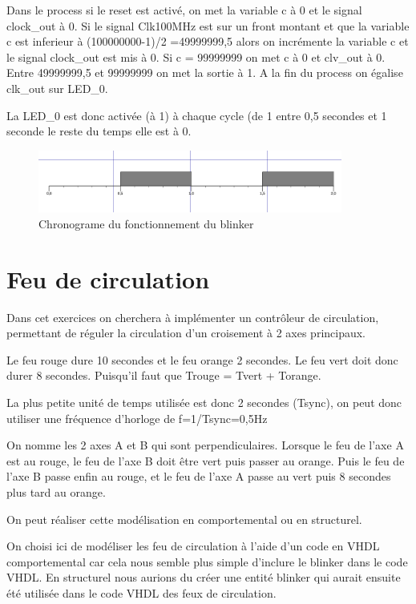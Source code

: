 \documentclass[11pt]{report}
\begin{document}
Dans le process si le reset est activé, on met la variable c à 0 et le signal clock\_out à 0. Si le signal Clk100MHz est sur un front montant et que la variable c est inferieur à (100000000-1)/2 =49999999,5 alors on incrémente la variable c et le signal clock\_out est mis à 0. Si c = 99999999 on met c à 0 et clv\_out à 0. Entre 49999999,5 et 99999999 on met la sortie à 1.
A la fin du process on égalise clk\_out sur LED\_0.

La LED\_0 est donc activée (à 1) à chaque cycle (de 1 entre 0,5 secondes et 1 seconde le reste du temps elle est à 0.

\begin{figure}[h]
\includegraphics[width=10cm]{TP03-1.PNG}
\caption{Chronograme du fonctionnement du blinker}
\end{figure}


\section{Feu de circulation}

Dans cet exercices on cherchera à implémenter un contrôleur de circulation, permettant de réguler la circulation d'un croisement à 2 axes principaux.

Le feu rouge dure 10 secondes et le feu orange 2 secondes. Le feu vert doit donc durer 8 secondes. Puisqu'il faut que Trouge = Tvert + Torange.

La plus petite unité de temps utilisée est donc 2 secondes (Tsync), on  peut donc utiliser une fréquence d'horloge de f=1/Tsync=0,5Hz

On nomme les 2 axes A et B qui sont perpendiculaires. Lorsque le feu de l'axe A est au rouge, le feu de l'axe B doit être vert puis passer au orange. Puis le feu de l'axe B passe enfin au rouge, et le feu de l'axe A passe au vert puis 8 secondes plus tard au orange.

On peut réaliser cette modélisation en comportemental ou en structurel.

On choisi ici de modéliser les feu de circulation à l'aide d'un code en VHDL comportemental car cela nous semble plus simple d'inclure le blinker dans le code VHDL. En structurel nous aurions du créer une entité blinker qui aurait ensuite été utilisée dans le code VHDL des feux de circulation. 
\end{document}
